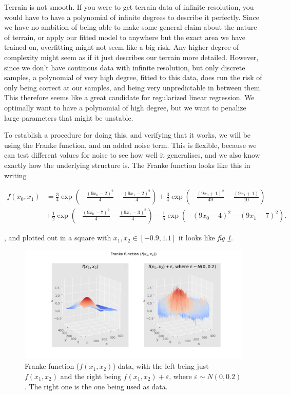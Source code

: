 \documentclass[11pt, a4paper]{report}
\begin{document}
Terrain is not smooth. If you were to get terrain data of infinite resolution, you would have to have a polynomial of infinite degrees to describe it perfectly. Since we have no ambition of being able to make some general claim about the nature of terrain, or apply our fitted model to anywhere but the exact area we have trained on, overfitting might not seem like a big risk. Any higher degree of complexity might seem as if it just describes our terrain more detailed. However, since we don't have continous data with infinite resolution, but only discrete samples, a polynomial of very high degree, fitted to this data, does run the risk of only being correct at our samples, and being very unpredictable in between them. This therefore seems like a great candidate for regularized linear regression. We optimally want to have a polynomial of high degree, but we want to penalize large parameters that might be unstable.

To establish a procedure for doing this, and verifying that it works, we will be using the Franke function, and an added noise term. This is flexible, because we can test different values for noise to see how well it generalises, and we also know exactly how the underlying structure is. The Franke function looks like this in writing

\begin{align*}
f(x_0, x_1) &= \frac{3}{4}\exp{\left(-\frac{(9x_0-2)^2}{4} - \frac{(9x_1-2)^2}{4}\right)}+\frac{3}{4}\exp{\left(-\frac{(9x_0+1)^2}{49}- \frac{(9x_1+1)}{10}\right)} \\
&+\frac{1}{2}\exp{\left(-\frac{(9x_0-7)^2}{4} - \frac{(9x_1-3)^2}{4}\right)} -\frac{1}{5}\exp{\left(-(9x_0-4)^2 - (9x_1-7)^2\right) }.
\end{align*}

, and plotted out in a square with $x_1, x_2 \in [-0.9, 1.1]$ it looks like \emph{fig \ref{fig:franke}}.

\begin{figure}
\includegraphics[width=\textwidth]{../plots/franke.png}
\caption{Franke function ($f(x_1, x_2)$) data, with the left being just $f(x_1, x_2)$ and the right being $f(x_1, x_2) + \varepsilon$, where $\varepsilon \sim N(0,0.2)$. The right one is the one being used as data.}
\label{fig:franke}
\end{figure}
\end{document}
